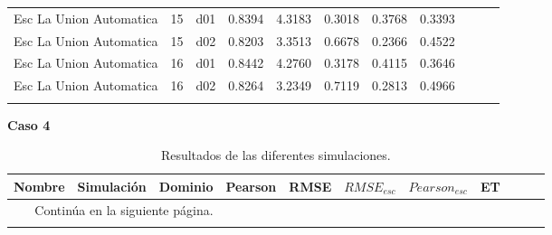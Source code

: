 \begin{landscape}
\begin{longtable}{p{2cm}rrrrrrrrrr}
  Esc La Union Automatica &         15 &     d01 &   0.8394 &  4.3183 &        0.3018 &           0.3768 &  0.3393 \\
  Esc La Union Automatica &         15 &     d02 &   0.8203 &  3.3513 &        0.6678 &           0.2366 &  0.4522 \\
  Esc La Union Automatica &         16 &     d01 &   0.8442 &  4.2760 &        0.3178 &           0.4115 &  0.3646 \\
  Esc La Union Automatica &         16 &     d02 &   0.8264 &  3.2349 &        0.7119 &           0.2813 &  0.4966 \\

\label{tab:estaciones_tiempo_wrf}

\end{longtable}








\textbf{Caso 4}

\begin{longtable}{p{2cm}rrrrrrrrrr}
\caption{Resultados de las diferentes simulaciones.}
\label{tab:estaciones_tiempo_wrf}\\
\hline
   Nombre &  Simulación & Dominio &  Pearson &     RMSE &  $RMSE_{esc}$ &    $Pearson_{esc}$ &      ET \\
   
\midrule
\endhead
\midrule
\multicolumn{3}{r}{{Continúa en la siguiente página.}} \\
\midrule
\endfoot

\bottomrule
\endlastfoot


\end{longtable}
\end{landscape}
